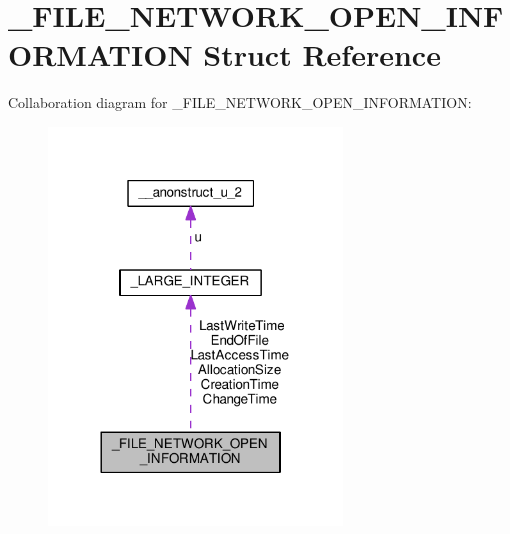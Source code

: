 \hypertarget{struct__FILE__NETWORK__OPEN__INFORMATION}{}\section{\+\_\+\+F\+I\+L\+E\+\_\+\+N\+E\+T\+W\+O\+R\+K\+\_\+\+O\+P\+E\+N\+\_\+\+I\+N\+F\+O\+R\+M\+A\+T\+I\+O\+N Struct Reference}
\label{struct__FILE__NETWORK__OPEN__INFORMATION}


Collaboration diagram for \+\_\+\+F\+I\+L\+E\+\_\+\+N\+E\+T\+W\+O\+R\+K\+\_\+\+O\+P\+E\+N\+\_\+\+I\+N\+F\+O\+R\+M\+A\+T\+I\+O\+N\+:
\nopagebreak
\begin{figure}[H]
\begin{center}
\leavevmode
\includegraphics[width=221pt]{struct__FILE__NETWORK__OPEN__INFORMATION__coll__graph}
\end{center}
\end{figure}
